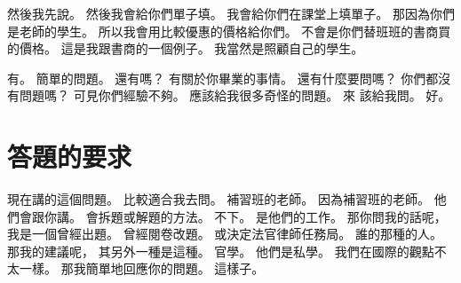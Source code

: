 \hypertarget{c01:cue:3573}{}然後我先說。
\hypertarget{c01:cue:3574}{}然後我會給你們單子填。
\hypertarget{c01:cue:3575}{}我會給你們在課堂上填單子。
\hypertarget{c01:cue:3576}{}那因為你們是老師的學生。
\hypertarget{c01:cue:3577}{}所以我會用比較優惠的價格給你們。
\hypertarget{c01:cue:3578}{}不會是你們替班班的書商買的價格。
\hypertarget{c01:cue:3579}{}這是我跟書商的一個例子。
\hypertarget{c01:cue:3580}{}我當然是照顧自己的學生。

\hypertarget{c01:cue:3581}{}有。
\hypertarget{c01:cue:3582}{}簡單的問題。
\hypertarget{c01:cue:3583}{}還有嗎？
\hypertarget{c01:cue:3584}{}有關於你畢業的事情。
\hypertarget{c01:cue:3585}{}還有什麼要問嗎？
\hypertarget{c01:cue:3586}{}你們都沒有問題嗎？
\hypertarget{c01:cue:3587}{}可見你們經驗不夠。
\hypertarget{c01:cue:3588}{}應該給我很多奇怪的問題。
\hypertarget{c01:cue:3589}{}來 該給我問。
\hypertarget{c01:cue:3590}{}好。

\section{答題的要求}

\hypertarget{c01:cue:3591}{}現在講的這個問題。
\hypertarget{c01:cue:3592}{}比較適合我去問。
\hypertarget{c01:cue:3593}{}補習班的老師。
\hypertarget{c01:cue:3594}{}因為補習班的老師。
\hypertarget{c01:cue:3595}{}他們會跟你講。
\hypertarget{c01:cue:3596}{}會拆題或解題的方法。
\hypertarget{c01:cue:3597}{}不下。
\hypertarget{c01:cue:3598}{}是他們的工作。
\hypertarget{c01:cue:3599}{}那你問我的話呢，
\hypertarget{c01:cue:3600}{}我是一個曾經出題。
\hypertarget{c01:cue:3601}{}曾經閱卷改題。
\hypertarget{c01:cue:3602}{}或決定法官律師任務局。
\hypertarget{c01:cue:3603}{}誰的那種的人。
\hypertarget{c01:cue:3604}{}那我的建議呢，
\hypertarget{c01:cue:3605}{}其另外一種是這種。
\hypertarget{c01:cue:3606}{}官學。
\hypertarget{c01:cue:3607}{}他們是私學。
\hypertarget{c01:cue:3608}{}我們在國際的觀點不太一樣。
\hypertarget{c01:cue:3609}{}那我簡單地回應你的問題。
\hypertarget{c01:cue:3610}{}這樣子。

